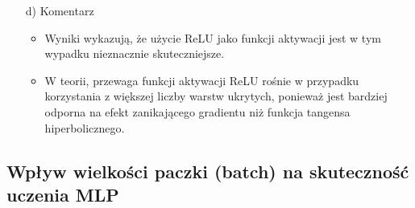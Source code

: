 \documentclass[17pt]{article}
\begin{document}
\begin{enumerate}
\item[d)] Komentarz
\begin{itemize}
\item Wyniki wykazują, że użycie ReLU jako funkcji aktywacji jest w tym wypadku nieznacznie skuteczniejsze. 
\item W teorii, przewaga funkcji aktywacji ReLU rośnie w przypadku korzystania z większej liczby warstw ukrytych, ponieważ jest bardziej odporna na efekt zanikającego gradientu niż funkcja tangensa hiperbolicznego.
\end{itemize}

\end{enumerate}
\newpage

\subsection{Wpływ wielkości paczki (batch) na skuteczność uczenia MLP}
\vspace{4mm}
\end{document}
